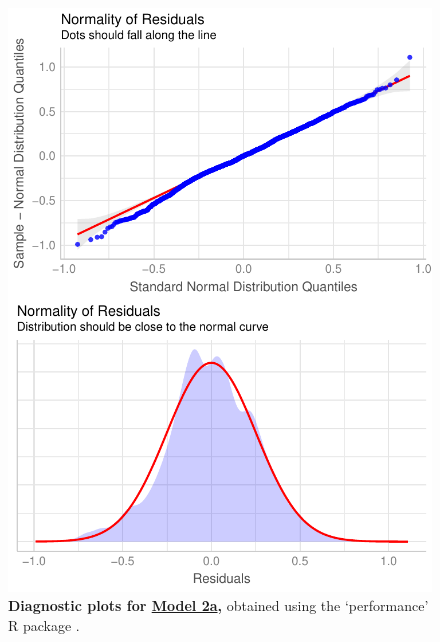\begin{figure}[h!]
\centering
\includegraphics[scale=0.7]{Supporting/Chapter3/Figures/Diagnostics/SI_diagnostics_Model2a}
\caption[Diagnostic plots for Model 2a]{\textbf{Diagnostic plots for \underline{Model 2a},} obtained using the `performance' R package \citep{performance}.}
\label{SI3_F11}
\end{figure}

\newpage

